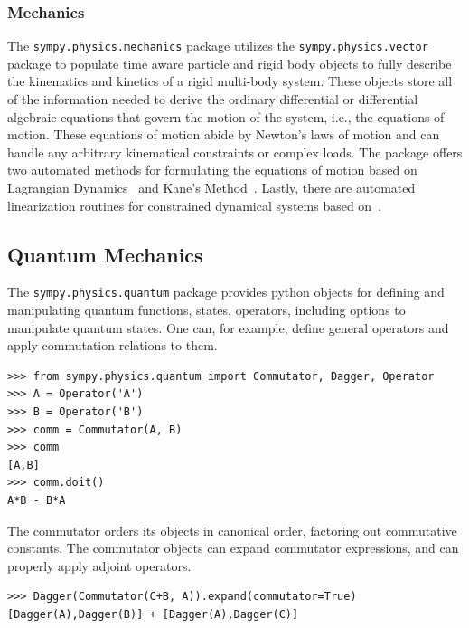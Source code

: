 \subsubsection{Mechanics}

The \verb|sympy.physics.mechanics| package utilizes the \texttt{sympy.\allowbreak{}physics.\allowbreak{}vector} package
to populate time aware particle and rigid body objects to fully describe the
kinematics and kinetics of a rigid multi-body system. These objects store all
of the information needed to derive the ordinary differential or differential
algebraic equations that govern the motion of the system, i.e., the equations
of motion. These equations of motion abide by Newton's laws of motion and can
handle any arbitrary kinematical constraints or complex loads. The package
offers two automated methods for formulating the equations of motion based on
Lagrangian Dynamics~\cite{Lagrange1811} and Kane's Method~\cite{Kane1985}. Lastly, there
are automated linearization routines for constrained dynamical
systems based on~\cite{Peterson2014}.

\subsection{Quantum Mechanics}

The \verb|sympy.physics.quantum| package provides python objects for defining and manipulating quantum functions, states, operators, including options to manipulate quantum states. One can, for example, define general operators and apply commutation relations to them.
\begin{verbatim}
>>> from sympy.physics.quantum import Commutator, Dagger, Operator
>>> A = Operator('A')
>>> B = Operator('B')
>>> comm = Commutator(A, B)
>>> comm
[A,B]
>>> comm.doit()
A*B - B*A
\end{verbatim}
The commutator orders its objects in canonical order, factoring out commutative constants. The commutator objects can expand commutator expressions, and can properly apply adjoint operators.
\begin{verbatim}
>>> Dagger(Commutator(C+B, A)).expand(commutator=True)
[Dagger(A),Dagger(B)] + [Dagger(A),Dagger(C)]
\end{verbatim}

